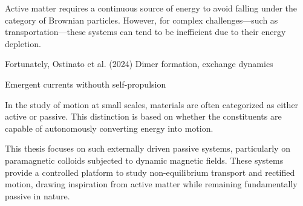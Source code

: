 Active matter requires a continuous source of energy to avoid falling under the category of Brownian particles. However, for complex challenges—such as transportation—these systems can tend to be inefficient due to their energy depletion.

Fortunately, Ostinato et al. (2024)
Dimer formation, exchange dynamics

Emergent currents withouth self-propulsion

In the study of motion at small scales, materials are often categorized as either active or passive. This distinction is based on whether the constituents are capable of autonomously converting energy into motion.


This thesis focuses on such externally driven passive systems, particularly on paramagnetic colloids subjected to dynamic magnetic fields. These systems provide a controlled platform to study non-equilibrium transport and rectified motion, drawing inspiration from active matter while remaining fundamentally passive in nature.

\newpage
